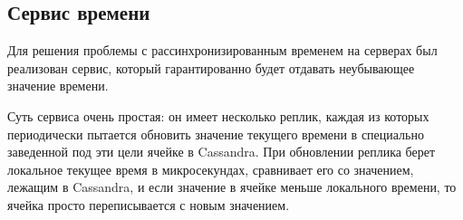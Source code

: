 \subsection{Сервис времени}

Для решения проблемы с рассинхронизированным временем на серверах был реализован сервис, который гарантированно будет отдавать неубывающее значение времени.

Суть сервиса очень простая: он имеет несколько реплик, каждая из которых периодически пытается обновить значение текущего времени в специально заведенной под эти цели ячейке в Cassandra. При обновлении реплика берет локальное текущее время в микросекундах, сравнивает его со значением, лежащим в Cassandra, и если значение в ячейке меньше локального времени, то ячейка просто переписывается с новым значением.